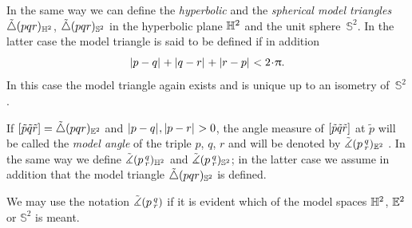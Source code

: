 In the same way we can define the \emph{hyperbolic} and the \emph{spherical model triangles} $\tilde\triangle(p q r)_{\mathbb{H}^2}$, $\tilde\triangle(p q r)_{\mathbb{S}^2}$
in the hyperbolic plane $\mathbb{H}^2$ and the unit sphere~$\mathbb{S}^2$.
In the latter case the model triangle is said to be defined if in addition
\[\dist{p}{q}{}+\dist{q}{r}{}+\dist{r}{p}{}< 2\cdot\pi.\]
In this case the model triangle again exists and is unique up to an isometry of~$\mathbb{S}^2$.

If 
$[\tilde p\tilde q\tilde r]=\tilde\triangle(p q r)_{\mathbb{E}^2}$ 
and $\dist{p}{q}{},\dist{p}{r}{}>0$, 
the angle measure of 
$[\tilde p\tilde q\tilde r]$ at $\tilde p$ 
will be called the \emph{model angle} of the triple $p$, $q$, $r$ and will be denoted by
$\tilde\measuredangle(p\,{}^{q}_{r})_{\mathbb{E}^2}$%
.
In the same way we define $\tilde\measuredangle(p\,{}^{q}_{r})_{\mathbb{H}^2}$ and $\tilde\measuredangle(p\,{}^{q}_{r})_{\mathbb{S}^2}$;
in the latter case  we assume in addition that the model triangle $\tilde\triangle(p q r)_{\mathbb{S}^2}$ is defined.

We may use the notation $\tilde\measuredangle(p\,{}^{q}_{r})$ if it is evident which of the model spaces $\mathbb{H}^2$, $\mathbb{E}^2$ or $\mathbb{S}^2$ is meant.


